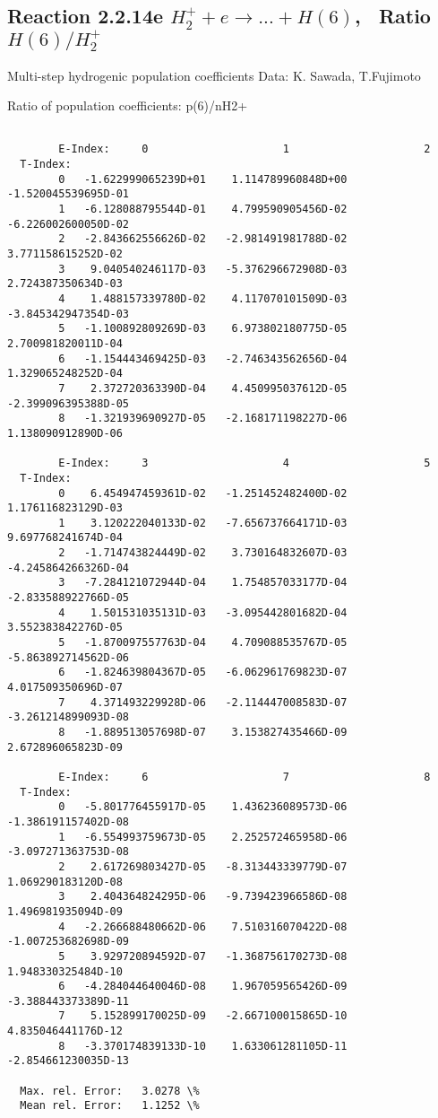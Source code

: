 \documentclass[12pt,dvipdfmx]{article}
\begin{document}
\subsection{
Reaction 2.2.14e $ H_2^+ + e \rightarrow ...+ H(6) $, \   Ratio $H(6)/H_2^+  $
}

 Multi-step hydrogenic population coefficients
 Data: K. Sawada, T.Fujimoto \cite{kn:Sawada}

 Ratio of population coefficients: p(6)/nH2+

\begin{small}\begin{verbatim}

        E-Index:     0                     1                     2
  T-Index:
        0   -1.622999065239D+01    1.114789960848D+00   -1.520045539695D-01
        1   -6.128088795544D-01    4.799590905456D-02   -6.226002600050D-02
        2   -2.843662556626D-02   -2.981491981788D-02    3.771158615252D-02
        3    9.040540246117D-03   -5.376296672908D-03    2.724387350634D-03
        4    1.488157339780D-02    4.117070101509D-03   -3.845342947354D-03
        5   -1.100892809269D-03    6.973802180775D-05    2.700981820011D-04
        6   -1.154443469425D-03   -2.746343562656D-04    1.329065248252D-04
        7    2.372720363390D-04    4.450995037612D-05   -2.399096395388D-05
        8   -1.321939690927D-05   -2.168171198227D-06    1.138090912890D-06

        E-Index:     3                     4                     5
  T-Index:
        0    6.454947459361D-02   -1.251452482400D-02    1.176116823129D-03
        1    3.120222040133D-02   -7.656737664171D-03    9.697768241674D-04
        2   -1.714743824449D-02    3.730164832607D-03   -4.245864266326D-04
        3   -7.284121072944D-04    1.754857033177D-04   -2.833588922766D-05
        4    1.501531035131D-03   -3.095442801682D-04    3.552383842276D-05
        5   -1.870097557763D-04    4.709088535767D-05   -5.863892714562D-06
        6   -1.824639804367D-05   -6.062961769823D-07    4.017509350696D-07
        7    4.371493229928D-06   -2.114447008583D-07   -3.261214899093D-08
        8   -1.889513057698D-07    3.153827435466D-09    2.672896065823D-09

        E-Index:     6                     7                     8
  T-Index:
        0   -5.801776455917D-05    1.436236089573D-06   -1.386191157402D-08
        1   -6.554993759673D-05    2.252572465958D-06   -3.097271363753D-08
        2    2.617269803427D-05   -8.313443339779D-07    1.069290183120D-08
        3    2.404364824295D-06   -9.739423966586D-08    1.496981935094D-09
        4   -2.266688480662D-06    7.510316070422D-08   -1.007253682698D-09
        5    3.929720894592D-07   -1.368756170273D-08    1.948330325484D-10
        6   -4.284044640046D-08    1.967059565426D-09   -3.388443373389D-11
        7    5.152899170025D-09   -2.667100015865D-10    4.835046441176D-12
        8   -3.370174839133D-10    1.633061281105D-11   -2.854661230035D-13

  Max. rel. Error:   3.0278 \%
  Mean rel. Error:   1.1252 \%

\end{verbatim}\end{small}
\end{document}

